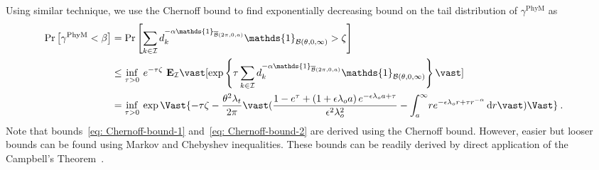 \documentclass[12pt, draftclsnofoot, onecolumn]{IEEEtran}
\begin{document}
Using similar technique, we use the Chernoff bound to find exponentially decreasing bound on the tail distribution of $\gamma^{\mathrm{PhyM}}$ as
\begin{align}\label{eq: Chernoff-bound-2}
\hspace{-5mm} \Pr \left[\gamma^{\mathrm{PhyM}} < \beta \right]  & = \Pr \left[ \sum_{k \in \mathcal{I}} d_{k}^{-\alpha  \mathds{1}_{\overline{\mathcal{B}}(2\pi,0,a)}} \mathds{1}_{\mathcal{B}(\theta,0,\infty)} > \zeta \right] \nonumber \\
& \leq \inf\limits_{\tau > 0} \: e^{-\tau\zeta}~\mathbf{E}_{\mathcal{I}} \vast[\exp\left\{\tau \sum_{k \in \mathcal{I}} d_{k}^{-\alpha  \mathds{1}_{\overline{\mathcal{B}}(2\pi,0,a)}} \mathds{1}_{\mathcal{B}(\theta,0,\infty)}\right\} \vast] \nonumber \\
& =  \inf\limits_{\tau > 0} \: \exp \Vast\{ -\tau \zeta - \frac{ \theta^2 \lambda_t}{2\pi } \vast( \frac{1 - e^{\tau} + \left( 1 + \epsilon\lambda_o a\right)e^{-\epsilon\lambda_o a+\tau}}{\epsilon^2 \lambda_{o}^{2}} -  \int_{a}^{\infty} \! r e^{-\epsilon\lambda_o r +\tau r^{-\alpha}} \, \mathrm{d}r \vast) \Vast\} \:.
\end{align}
Note that bounds~\eqref{eq: Chernoff-bound-1} and~\eqref{eq: Chernoff-bound-2} are derived using the Chernoff bound. However, easier but looser bounds can be found using Markov and Chebyshev inequalities. These bounds can be readily derived by direct application of the Campbell's Theorem~\cite{Haenggi2013Stochastic}.
\end{document}
